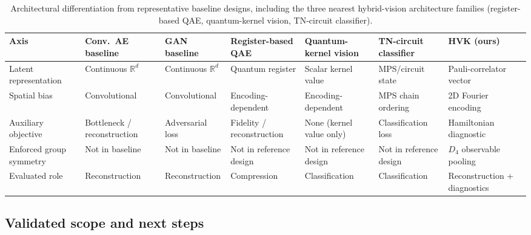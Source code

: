 \documentclass[pdflatex,sn-basic]{sn-jnl}
\begin{document}
\begin{table}[t]
  \centering
  \caption{Architectural differentiation from representative baseline designs,
           including the three nearest hybrid-vision architecture families
           (register-based QAE, quantum-kernel vision, TN-circuit classifier).}
  \label{tab:differentiation}
  \scriptsize
  \setlength{\tabcolsep}{3pt}
  \begin{tabularx}{\textwidth}{@{}L{0.13\textwidth} Y Y Y Y Y Y@{}}
    \toprule
    Axis
      & Conv.\ AE baseline
      & GAN baseline
      & Register-based QAE
      & Quantum-kernel vision
      & TN-circuit classifier
      & HVK (ours) \\
    \midrule
    Latent representation
      & Continuous $\mathbb{R}^d$
      & Continuous $\mathbb{R}^d$
      & Quantum register
      & Scalar kernel value
      & MPS\slash circuit state
      & Pauli-correlator vector \\
    \addlinespace
    Spatial bias
      & Convolutional
      & Convolutional
      & Encoding-dependent
      & Encoding-dependent
      & MPS chain ordering
      & 2D Fourier encoding \\
    \addlinespace
    Auxiliary objective
      & Bottleneck / reconstruction
      & Adversarial loss
      & Fidelity / reconstruction
      & None (kernel value only)
      & Classification loss
      & Hamiltonian diagnostic \\
    \addlinespace
    Enforced group symmetry
      & Not in baseline
      & Not in baseline
      & Not in reference design
      & Not in reference design
      & Not in reference design
      & $D_4$ observable pooling \\
    \addlinespace
    Evaluated role
      & Reconstruction
      & Reconstruction
      & Compression
      & Classification
      & Classification
      & Reconstruction + diagnostics \\
    \bottomrule
  \end{tabularx}
\end{table}

\subsection{Validated scope and next steps}
\label{sec:limitations}
\end{document}
